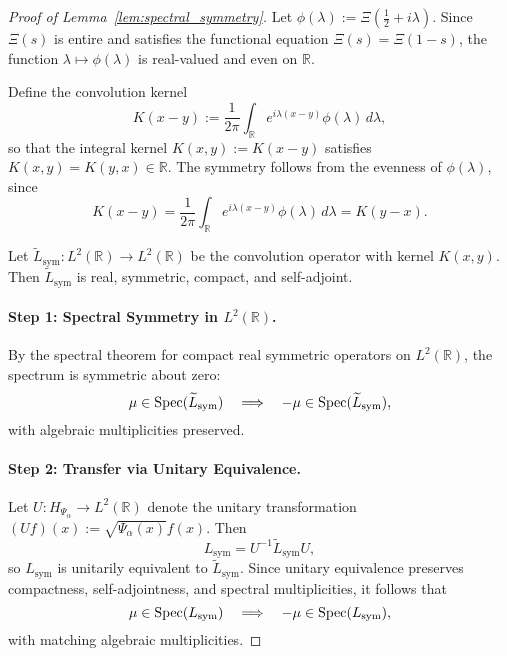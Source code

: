\begin{proof}[Proof of Lemma~\ref{lem:spectral_symmetry}]
Let \( \phi(\lambda) := \Xi\left(\tfrac{1}{2} + i\lambda\right) \). Since \( \Xi(s) \) is entire and satisfies the functional equation \( \Xi(s) = \Xi(1 - s) \), the function \( \lambda \mapsto \phi(\lambda) \) is real-valued and even on \( \mathbb{R} \).

Define the convolution kernel
\[
K(x - y) := \frac{1}{2\pi} \int_{\mathbb{R}} e^{i\lambda(x - y)} \phi(\lambda)\, d\lambda,
\]
so that the integral kernel \( K(x,y) := K(x - y) \) satisfies \( K(x,y) = K(y,x) \in \mathbb{R} \). The symmetry follows from the evenness of \( \phi(\lambda) \), since
\[
K(x - y) = \frac{1}{2\pi} \int_{\mathbb{R}} e^{i\lambda(x - y)} \phi(\lambda)\, d\lambda = K(y - x).
\]

Let \( \widetilde{L}_{\mathrm{sym}} \colon L^2(\mathbb{R}) \to L^2(\mathbb{R}) \) be the convolution operator with kernel \( K(x,y) \). Then \( \widetilde{L}_{\mathrm{sym}} \) is real, symmetric, compact, and self-adjoint.

\paragraph{Step 1: Spectral Symmetry in \( L^2(\mathbb{R}) \).}
By the spectral theorem for compact real symmetric operators on \( L^2(\mathbb{R}) \), the spectrum is symmetric about zero:
\[
\mu \in \operatorname{Spec}(\widetilde{L}_{\mathrm{sym}}) \quad \Longrightarrow \quad -\mu \in \operatorname{Spec}(\widetilde{L}_{\mathrm{sym}}),
\]
with algebraic multiplicities preserved.

\paragraph{Step 2: Transfer via Unitary Equivalence.}
Let \( U \colon H_{\Psi_\alpha} \to L^2(\mathbb{R}) \) denote the unitary transformation \( (Uf)(x) := \sqrt{\Psi_\alpha(x)} f(x) \). Then
\[
L_{\mathrm{sym}} = U^{-1} \widetilde{L}_{\mathrm{sym}} U,
\]
so \( L_{\mathrm{sym}} \) is unitarily equivalent to \( \widetilde{L}_{\mathrm{sym}} \). Since unitary equivalence preserves compactness, self-adjointness, and spectral multiplicities, it follows that
\[
\mu \in \operatorname{Spec}(L_{\mathrm{sym}}) \quad \Longrightarrow \quad -\mu \in \operatorname{Spec}(L_{\mathrm{sym}}),
\]
with matching algebraic multiplicities.
\end{proof}
%  